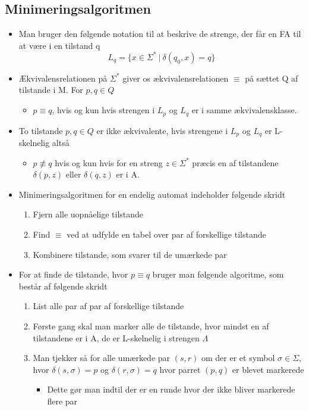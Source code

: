 \documentclass[a4, danish]{article}
\begin{document}
\subsection{Minimeringsalgoritmen}
\begin{itemize}
  \item Man bruger den følgende notation til at beskrive de strenge, der får en FA til at være i en tilstand q
  \begin{equation*}
    L_q=\{x \in \Sigma^* \ | \ \delta(q_0,x)=q \}
  \end{equation*}
  \item Ækvivalensrelationen på $\Sigma^*$ giver os ækvivalensrelationen $\equiv$ på sættet Q af tilstande i M. For $p,q \in Q$
  \begin{itemize}
    \item $p \equiv q$, hvis og kun hvis strengen i $L_p$ og $L_q$ er i samme ækvivalensklasse. 
  \end{itemize}
  \item To tilstande $p,q \in Q$ er ikke ækvivalente, hvis strengene i $L_p$ og $L_q$ er L-skelnelig altså
  \begin{itemize}
    \item $p \not\equiv q$ hvis og kun hvis for en streng $z \in \Sigma^*$ præcis en af tilstandene $\delta(p,z)$ eller $\delta(q,z)$ er i A.
  \end{itemize}
  \item Minimeringsalgoritmen for en endelig automat indeholder følgende skridt
  \begin{enumerate}
    \item Fjern alle uopnåelige tilstande 
    \item Find $\equiv$ ved at udfylde en tabel over par af forskellige tilstande
    \item Kombinere tilstande, som svarer til de umærkede par   
  \end{enumerate}
  \item For at finde de tilstande, hvor $p \equiv q$ bruger man følgende algoritme, som består af følgende skridt
  \begin{enumerate}
    \item List alle par af par af forskellige tilstande 
    \item Første gang skal man marker alle de tilstande, hvor mindst en af tilstandene er i A, de er L-skelnelig i strengen $\Lambda$
    \item Man tjekker så for alle umærkede par $(s,r)$ om der er et symbol $\sigma \in \Sigma$, hvor $\delta(s,\sigma)=p$ og  $\delta(r,\sigma)=q$ hvor parret $(p,q)$ er blevet markerede 
    \begin{itemize}
      \item Dette gør man indtil der er en runde hvor der ikke bliver markerede flere par 
    \end{itemize}
   \end{enumerate}
\end{itemize}
\end{document}
